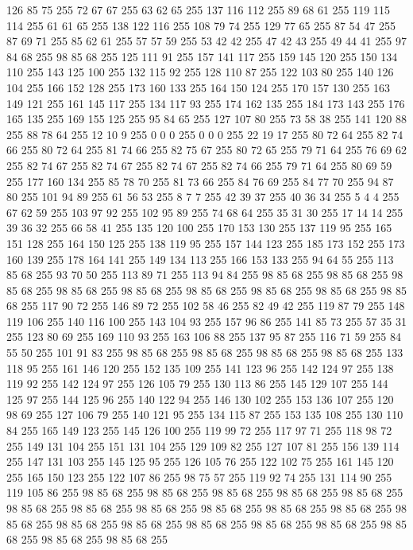126 85 75 255 72 67 67 255 63 62 65 255 137 116 112 255 89 68 61 255 119 115 114 255 61 61 65 255 138 122 116 255 108 79 74 255 129 77 65 255 87 54 47 255 87 69 71 255 85 62 61 255 57 57 59 255 53 42 42 255 47 42 43 255 49 44 41 255 97 84 68 255 98 85 68 255 125 111 91 255 157 141 117 255 159 145 120 255 150 134 110 255 143 125 100 255 132 115 92 255 128 110 87 255 122 103 80 255 140 126 104 255 166 152 128 255 173 160 133 255 164 150 124 255 170 157 130 255 163 149 121 255 161 145 117 255 134 117 93 255 174 162 135 255 184 173 143 255 176 165 135 255 169 155 125 255 95 84 65 255 127 107 80 255 73 58 38 255 141 120 88 255 88 78 64 255 12 10 9 255 0 0 0 255 0 0 0 255 22 19 17 255 80 72 64 255 82 74 66 255 80 72 64 255 81 74 66 255 82 75 67 255 80 72 65 255 79 71 64 255 76 69 62 255 82 74 67 255 82 74 67 255 82 74 67 255 82 74 66 255 79 71 64 255 80 69 59 255 177 160 134 255 85 78 70 255
81 73 66 255 84 76 69 255 84 77 70 255 94 87 80 255 101 94 89 255 61 56 53 255 8 7 7 255 42 39 37 255 40 36 34 255 5 4 4 255 67 62 59 255 103 97 92 255 102 95 89 255 74 68 64 255 35 31 30 255 17 14 14 255 39 36 32 255 66 58 41 255 135 120 100 255 170 153 130 255 137 119 95 255 165 151 128 255 164 150 125 255 138 119 95 255 157 144 123 255 185 173 152 255 173 160 139 255 178 164 141 255 149 134 113 255 166 153 133 255 94 64 55 255 113 85 68 255 93 70 50 255 113 89 71 255 113 94 84 255 98 85 68 255 98 85 68 255 98 85 68 255 98 85 68 255 98 85 68 255 98 85 68 255 98 85 68 255 98 85 68 255 98 85 68 255 117 90 72 255 146 89 72 255 102 58 46 255 82 49 42 255 119 87 79 255 148 119 106 255 140 116 100 255 143 104 93 255 157 96 86 255 141 85 73 255 57 35 31 255 123 80 69 255 169 110 93 255 163 106 88 255 137 95 87 255 116 71 59 255 84 55 50 255 101 91 83 255 98 85 68 255 98 85 68 255
98 85 68 255 98 85 68 255 133 118 95 255 161 146 120 255 152 135 109 255 141 123 96 255 142 124 97 255 138 119 92 255 142 124 97 255 126 105 79 255 130 113 86 255 145 129 107 255 144 125 97 255 144 125 96 255 140 122 94 255 146 130 102 255 153 136 107 255 120 98 69 255 127 106 79 255 140 121 95 255 134 115 87 255 153 135 108 255 130 110 84 255 165 149 123 255 145 126 100 255 119 99 72 255 117 97 71 255 118 98 72 255 149 131 104 255 151 131 104 255 129 109 82 255 127 107 81 255 156 139 114 255 147 131 103 255 145 125 95 255 126 105 76 255 122 102 75 255 161 145 120 255 165 150 123 255 122 107 86 255 98 75 57 255 119 92 74 255 131 114 90 255 119 105 86 255 98 85 68 255 98 85 68 255 98 85 68 255 98 85 68 255 98 85 68 255 98 85 68 255 98 85 68 255 98 85 68 255 98 85 68 255 98 85 68 255 98 85 68 255 98 85 68 255 98 85 68 255 98 85 68 255 98 85 68 255 98 85 68 255 98 85 68 255 98 85 68 255 98 85 68 255 98 85 68 255
